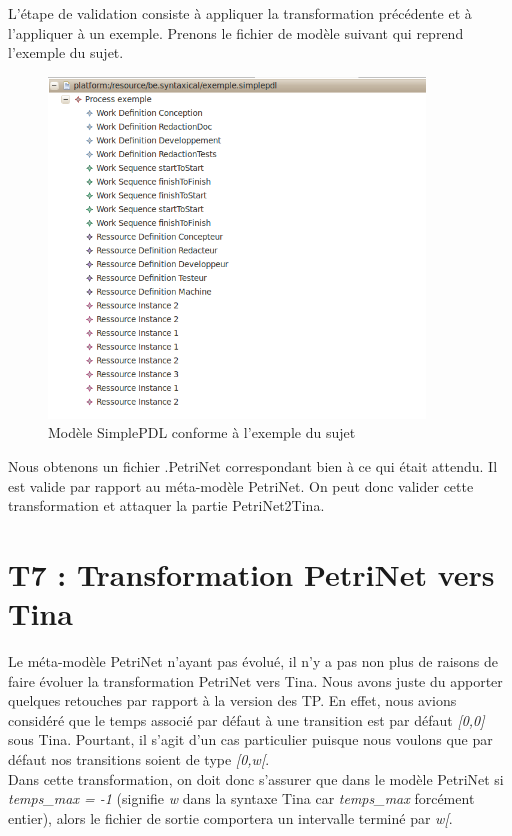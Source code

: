 \documentclass{report}
\begin{document}
L'étape de validation consiste à appliquer la transformation précédente et à l'appliquer à un exemple. Prenons le fichier de modèle suivant qui reprend l'exemple du sujet.

\begin{figure}[!h] 
\begin{center}
\includegraphics[width=10cm]{Capture-7.png}
\caption{Modèle SimplePDL conforme à l'exemple du sujet} 
\label{img1} 
\end{center}
\end{figure} 

Nous obtenons un fichier .PetriNet correspondant bien à ce qui était attendu. Il est valide par rapport au méta-modèle PetriNet.
On peut donc valider cette transformation et attaquer la partie PetriNet2Tina.

\section{T7 : Transformation PetriNet vers Tina}

Le méta-modèle PetriNet n'ayant pas évolué, il n'y a pas non plus de raisons de faire évoluer la transformation PetriNet vers Tina. 
Nous avons juste du apporter quelques retouches par rapport à la version des TP. En effet, nous avions considéré que le temps associé par défaut à une transition est par défaut \textit{[0,0]} sous Tina. Pourtant, il s'agit d'un cas particulier puisque nous voulons que par défaut nos transitions soient de type \textit{[0,w[}.\\

Dans cette transformation, on doit donc s'assurer que dans le modèle PetriNet si \textit{temps\_max = -1} (signifie \textit{w} dans la syntaxe Tina car \textit{temps\_max} forcément entier), alors le fichier de sortie comportera un intervalle terminé par \textit{w[}.\\
\end{document}
